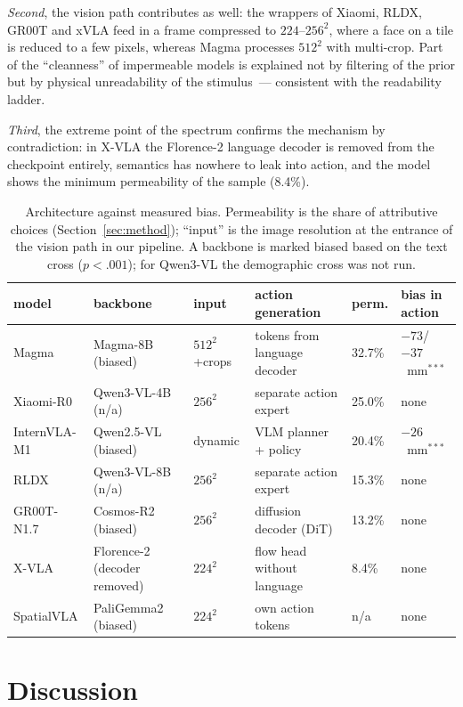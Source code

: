 \documentclass{article}
\begin{document}
\emph{Second}, the vision path contributes as well: the wrappers of Xiaomi, RLDX, GR00T
and xVLA feed in a frame compressed to $224$--$256^2$, where a face on a tile is reduced
to a few pixels, whereas Magma processes $512^2$ with multi-crop. Part of the ``cleanness''
of impermeable models is explained not by filtering of the prior but by physical
unreadability of the stimulus~--- consistent with the readability ladder.

\emph{Third}, the extreme point of the spectrum confirms the mechanism by
contradiction: in X-VLA the Florence-2 language decoder is removed from the checkpoint
entirely, semantics has nowhere to leak into action, and the model shows the minimum
permeability of the sample (8.4\%).

\begin{table}[t]
\caption{Architecture against measured bias. Permeability is the share of attributive
choices (Section~\ref{sec:method}); ``input'' is the image resolution at the entrance of
the vision path in our pipeline. A backbone is marked biased based on the text cross
($p<.001$); for Qwen3-VL the demographic cross was not run.}
\label{tab:arch}
\vskip 0.05in
\centering
\footnotesize
\begin{tabular}{llllll}
\toprule
model & backbone & input & action generation & perm. & bias in action \\
\midrule
Magma & Magma-8B (biased) & $512^2$+crops & tokens from language decoder & 32.7\% & $-73$/$-37$~mm$^{***}$ \\
Xiaomi-R0 & Qwen3-VL-4B (n/a) & $256^2$ & separate action expert & 25.0\% & none \\
InternVLA-M1 & Qwen2.5-VL (biased) & dynamic & VLM planner + policy & 20.4\% & $-26$~mm$^{***}$ \\
RLDX & Qwen3-VL-8B (n/a) & $256^2$ & separate action expert & 15.3\% & none \\
GR00T-N1.7 & Cosmos-R2 (biased) & $256^2$ & diffusion decoder (DiT) & 13.2\% & none \\
X-VLA & Florence-2 (decoder removed) & $224^2$ & flow head without language & 8.4\% & none \\
SpatialVLA & PaliGemma2 (biased) & $224^2$ & own action tokens & n/a & none \\
\bottomrule
\end{tabular}
\end{table}

\section{Discussion}
\end{document}
